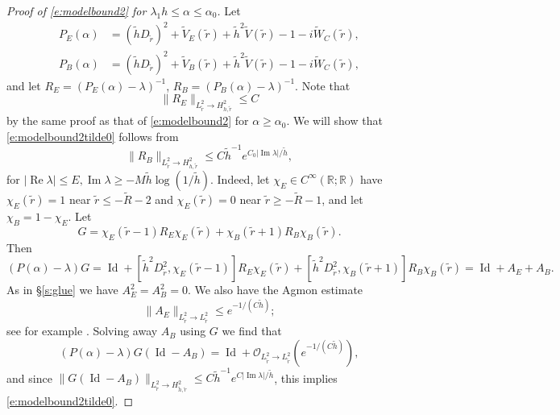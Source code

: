 \documentclass[reqno, 12pt]{amsart}
\newcommand \R {\mathbb{R}}
\newcommand \Oh {\mathcal{O}}
\DeclareMathOperator \re {Re}
\DeclareMathOperator \im {Im}
\DeclareMathOperator \Id {Id}
\theoremstyle{definition}
\numberwithin{equation}{section}
\numberwithin{prop}{section}
\numberwithin{figure}{section}
\begin{document}
\begin{proof}[Proof of \eqref{e:modelbound2} for $\lambda_1 h \le \alpha \le \alpha_0$]
 Let
\[\begin{split}
P_E(\alpha) &=  (\tilde hD_{\tilde r})^2 + \widetilde V_E(\tilde r) + \tilde h^2 \widetilde V(\tilde r) - 1 - i\widetilde W_C(\tilde r), \\ P_B(\alpha) &=  (\tilde hD_{\tilde r})^2 + \widetilde V_B(\tilde r) + \tilde h^2 \widetilde V(\tilde r) - 1 - i\widetilde W_C(\tilde r),
\end{split}\]
and let $R_E = (P_E(\alpha)-\lambda)^{-1}$, $R_B = (P_B(\alpha)-\lambda)^{-1}$. Note that 
\[
\|R_E\|_{L^2_{\tilde r} \to H^2_{h,\tilde r}} \le C
\]
by the same proof as that of  \eqref{e:modelbound2} for $\alpha \ge \alpha_0$.
 We will show that \eqref{e:modelbound2tilde0} follows from
\begin{equation}\label{e:modelbound2tilde}
\|R_B\|_{L^2_{\tilde r} \to H^2_{h,\tilde r}} \le C \tilde h^{-1}e^{C_0 |\im \lambda| /\tilde h},
\end{equation}
for $|\re \lambda| \le E, \im \lambda \ge - M \tilde h \log (1/\tilde h)$. Indeed, let $\chi_E \in C^\infty(\R;\R)$ have $\chi_E(\tilde r) = 1$ near $\tilde r \le- \widetilde R-2$ and  $\chi_E(\tilde r) = 0$ near  $\tilde r \ge- \widetilde R-1$, and let $\chi_B = 1 - \chi_E$. Let
\[
G = \chi_E(\tilde r - 1) R_E \chi_E(\tilde r) +  \chi_B(\tilde r + 1) R_B \chi_B(\tilde r).
\]
Then
\[
(P(\alpha) - \lambda) G = \Id + [\tilde h^2D_{\tilde r}^2,\chi_E(\tilde r - 1)]  R_E \chi_E(\tilde r) +  [\tilde h^2D_{\tilde r}^2,\chi_B(\tilde r + 1)] R_B \chi_B(\tilde r) = \Id + A_E + A_B.
\]
As in \S\ref{s:glue} we have $A_E^2 = A_B^2 = 0$. We also have the Agmon estimate
\[
\|A_E\|_{L^2_{\tilde r} \to L^2_{\tilde r}} \le e^{-1/(C\tilde h)};
\]
see for example \cite[Theorems 7.3 and 7.1]{ez}. Solving away $A_B$ using $G$ we find that
\begin{equation}\label{e:palphapar}
(P(\alpha) - \lambda) G (\Id - A_B) = \Id + \Oh_{L^2_{\tilde r}\to L^2_{\tilde r}}(e^{-1/(C\tilde h)}),
\end{equation}
and since $\|G (\Id - A_B)\|_{L^2_{\tilde r} \to H^2_{\tilde h,\tilde r}} \le C \tilde h^{-1} e^{C|\im \lambda|/\tilde h}$, this implies \eqref{e:modelbound2tilde0}.


\end{proof}
\end{document}
